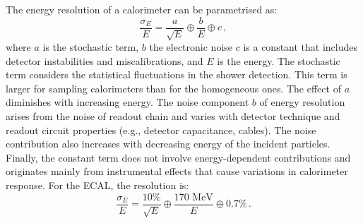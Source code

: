 The energy resolution of a calorimeter can be parametrised as:
\begin{equation*}
	\frac{\sigma_E}{E}= \frac{a}{\sqrt{E}} \oplus \frac{b}{E} \oplus c \, ,
\end{equation*}
where $a$ is the stochastic term, $b$ the electronic noise $c$ is a constant that includes detector instabilities and
miscalibrations, and $E$ is the energy. The stochastic term considers the statistical fluctuations in the shower detection. This term
is larger for sampling calorimeters than for the homogeneous ones. The effect of $a$ diminishes with
increasing energy. The noise component $b$ of energy resolution arises from the noise %
of readout chain and varies with detector technique and readout circuit properties (e.g., detector capacitance, cables). The noise contribution 
also increases with decreasing energy of the incident particles. Finally, the constant term does not involve energy-dependent 
contributions and originates mainly from instrumental effects that cause variations in calorimeter response.
For the ECAL, the resolution is:
\begin{equation*}
	\frac{\sigma_E}{E} = \frac{10\%}{\sqrt{E}} \oplus \frac{170\textrm{ MeV}}{E} \oplus 0.7 \% \,.
\end{equation*}

\begin{comment}
\begin{figure}[!tbp]
  \begin{subfigure}[b]{0.49\textwidth}
    	\texttt{[image: Chapter2/ATLAS\_Calorimeters\_ECAL]}
	\caption{Sketch of section of the LAr EM barrel were the different layers are visible~\cite{ATLAS:2008xda}.}
    	\label{fig:Chap2:ATLAS:ECal}
  \end{subfigure}
  \hfill
  \begin{subfigure}[b]{0.49\textwidth}
    	\texttt{[image: Chapter2/ATLAS\_Calorimeters\_HCAL]}
	\caption{Mechanical assembly and optical readout of the tile calorimeter of the HCAL.}
    	\label{fig:Chap2:ATLAS:HCal}
  \end{subfigure}
  \caption{Sketch of a section of the ATLAS (a) ECAL and (b) HCAL~\cite{ATLAS:2008xda}.}
\end{figure}
\end{comment}



